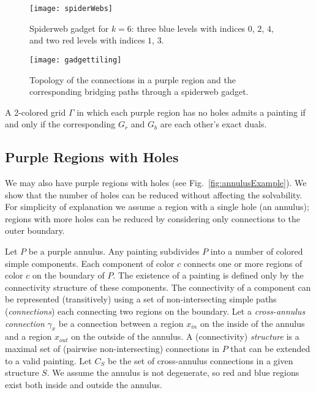 \documentclass[runningheads]{llncs}
\begin{document}
\begin{figure}[t]
\begin{minipage}[t]{.42\textwidth}
	\centering
	\texttt{[image: spiderWebs]}
	\caption{Spiderweb gadget for $k=6$: three blue levels with indices $0$, $2$, $4$, and two red levels with indices $1$, $3$.}
	\label{fig:gadgetindices}
\end{minipage}
\hfill
\begin{minipage}[t]{.54\textwidth}
	\centering
	\texttt{[image: gadgettiling]}
	\caption{Topology of the connections in a purple region and the corresponding bridging paths through a spiderweb gadget.}
	\label{fig:gadgetpainting}
\end{minipage}
\end{figure}

\begin{lemma}\label{the:dualPainting2}
A 2-colored grid $\Gamma$ in which each purple region has no holes admits a painting if and only if the corresponding $G_r$ and $G_b$ are each other's exact duals.
\end{lemma}

\subsection{Purple Regions with Holes}
\label{ssec:annuli}
We may also have purple regions with holes (see Fig.~\ref{fig:annulusExample}).
We show that the number of holes can be reduced without affecting the solvability.
For simplicity of explanation we assume a region with a single hole (an annulus); regions with more holes can be reduced by considering only connections to the outer boundary.

Let $P$ be a purple annulus.
Any painting subdivides $P$ into a number of colored simple components.
Each component of color $c$ connects one or more regions of color $c$ on the boundary of $P$.
The existence of a painting is defined only by the connectivity structure of these components.
The connectivity of a component can be represented (transitively) using a set of non-intersecting simple paths (\emph{connections}) each connecting two regions on the boundary.
Let a \emph{cross-annulus connection} $\gamma_x$ be a connection between a region $x_{in}$ on the inside of the annulus and a region $x_{out}$ on the outside of the annulus.
A (connectivity) \emph{structure} is a maximal set of (pairwise non-intersecting) connections in $P$ that can be extended to a valid painting.
Let $C_S$ be the set of cross-annulus connections in a given structure $S$.
We assume the annulus is not degenerate, so red and blue regions exist both inside and outside the annulus.
\end{document}
